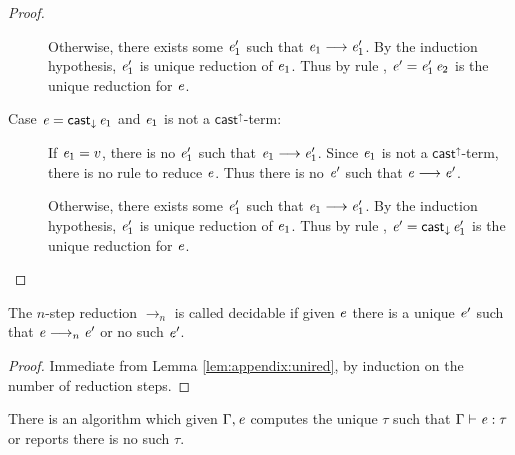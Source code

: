 \begin{proof}
\begin{description}
		Otherwise, there exists some $\mathit{e'_{{\mathrm{1}}}}$ such that $\mathit{e_{{\mathrm{1}}}}  \longrightarrow  \mathit{e'_{{\mathrm{1}}}}$. By the
induction hypothesis, $\mathit{e'_{{\mathrm{1}}}}$ is unique reduction of $\mathit{e_{{\mathrm{1}}}}$. Thus by rule
, $\mathit{e}'=\mathit{e'_{{\mathrm{1}}}} \, \mathit{e_{{\mathrm{2}}}}$ is the unique reduction for $\mathit{e}$.
		\item[Case $\mathit{e}=\mathsf{cast}_{\downarrow} \, \mathit{e_{{\mathrm{1}}}}$ and $\mathit{e_{{\mathrm{1}}}}$ is not a $ \mathsf{cast}^{\uparrow} $-term:]
If $\mathit{e_{{\mathrm{1}}}}=v$, there is no $\mathit{e'_{{\mathrm{1}}}}$ such that $\mathit{e_{{\mathrm{1}}}}  \longrightarrow  \mathit{e'_{{\mathrm{1}}}}$. Since $\mathit{e_{{\mathrm{1}}}}$
is not a $ \mathsf{cast}^{\uparrow} $-term, there is no rule to reduce $\mathit{e}$. Thus there is
no $\mathit{e}'$ such that $\mathit{e}  \longrightarrow  \mathit{e'}$.
		
		Otherwise, there exists some $\mathit{e'_{{\mathrm{1}}}}$ such that $\mathit{e_{{\mathrm{1}}}}  \longrightarrow  \mathit{e'_{{\mathrm{1}}}}$. By the
induction hypothesis, $\mathit{e'_{{\mathrm{1}}}}$ is unique reduction of $\mathit{e_{{\mathrm{1}}}}$. Thus by rule
, $\mathit{e}'=\mathsf{cast}_{\downarrow} \, \mathit{e'_{{\mathrm{1}}}}$ is the unique reduction for
$\mathit{e}$.
	\end{description}
\end{proof}

\begin{lem}\label{lem:appendix:uniquen}
    The $n$-step reduction $ \longrightarrow_n $ is called decidable if 
    given $\mathit{e}$ there is a unique $\mathit{e'}$ such that $\mathit{e}  \longrightarrow_n  \mathit{e'}$ or no such $\mathit{e'}$.
\end{lem}

\begin{proof}
	Immediate from Lemma \ref{lem:appendix:unired}, by induction on the number of
reduction steps.
\end{proof}

\begin{thm}
	There is an algorithm which given $\Gamma, \mathit{e}$ computes the unique
$\tau$ such that $\Gamma  \vdash  \mathit{e}  :  \tau$ or reports there is no such $\tau$.
\end{thm}

